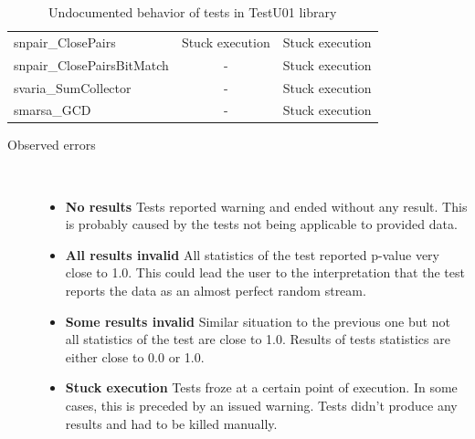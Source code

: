 \documentclass[
  digital,  	%
  color,		%
  oneside,   	%
  12pt,
  nocover,
  notable,
  nolof,
  nolot,
]{fithesis3}
\newenvironment{titlemize}[1]
{
	\begin{description}
	\item[#1]\
	\begin{itemize}
}
{
	\end{itemize}
 	\end{description}
}
\begin{document}
\begin{table}[h!]
\begin{nomar}
\begin{tabular}{l || c | c }
snpair\_ClosePairs                 & Stuck execution          & Stuck execution          \\
snpair\_ClosePairsBitMatch         & -                        & Stuck execution          \\
svaria\_SumCollector               & -                        & Stuck execution          \\
smarsa\_GCD                        & -                        & Stuck execution          \\                                       
\end{tabular}
\end{nomar}  
\caption{Undocumented behavior of tests in TestU01 library}
\label{tab:testu01-errors}                                                                                           
\end{table}

\begin{titlemize}{Observed errors}
\item \textbf{No results} Tests reported warning and ended without any result. This is probably caused by the tests not being applicable to provided data.
\item \textbf{All results invalid}  All statistics of the test reported p-value very close to 1.0. This could lead the user to the interpretation that the test reports the data as an almost perfect random stream.
\item \textbf{Some results invalid} Similar situation to the previous one but not all statistics of the test are close to 1.0. Results of tests statistics are either close to 0.0 or 1.0.
\item \textbf{Stuck execution} Tests froze at a certain point of execution. In some cases, this is preceded by an issued warning. Tests didn't produce any results and had to be killed manually.
\end{titlemize}
\end{document}
